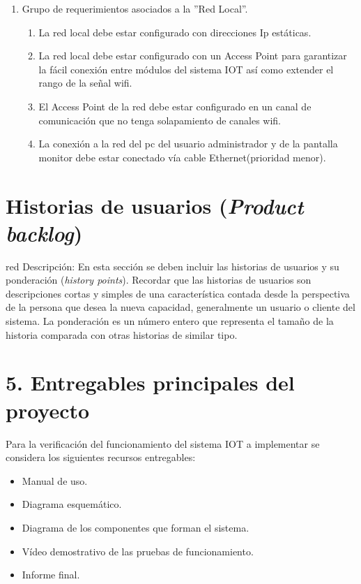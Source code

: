 \documentclass[11pt]{charter}
\begin{document}
\begin{enumerate}
\item Grupo de requerimientos asociados a la ''Red Local''.
	\begin{enumerate}
	\item La red local debe estar configurado con direcciones Ip estáticas.
	\item La red local debe estar configurado con un Access Point para garantizar la fácil conexión entre módulos del sistema IOT así como extender el rango de la señal wifi.
	\item El Access Point de la red debe estar configurado en un canal de comunicación que no tenga solapamiento de canales wifi.
	\item La conexión a la red del pc del usuario administrador y de la pantalla monitor debe estar conectado vía cable Ethernet(prioridad menor).
	\end{enumerate}

\end{enumerate}

\section{Historias de usuarios (\textit{Product backlog})}
\label{sec:backlog}

\begin{consigna}{red}
Descripción: En esta sección se deben incluir las historias de usuarios y su ponderación (\textit{history points}). Recordar que las historias de usuarios son descripciones cortas y simples de una característica contada desde la perspectiva de la persona que desea la nueva capacidad, generalmente un usuario o cliente del sistema. La ponderación es un número entero que representa el tamaño de la historia comparada con otras historias de similar tipo.
\end{consigna}

\section{5. Entregables principales del proyecto}
\label{sec:entregables}
Para la verificación del funcionamiento del sistema IOT a implementar se considera los siguientes recursos entregables:
\begin{itemize}
\item Manual de uso.
\item Diagrama esquemático.
\item Diagrama de los componentes que forman el sistema.
\item Vídeo demostrativo de las pruebas de funcionamiento.
\item Informe final.

\end{itemize}
\end{document}

